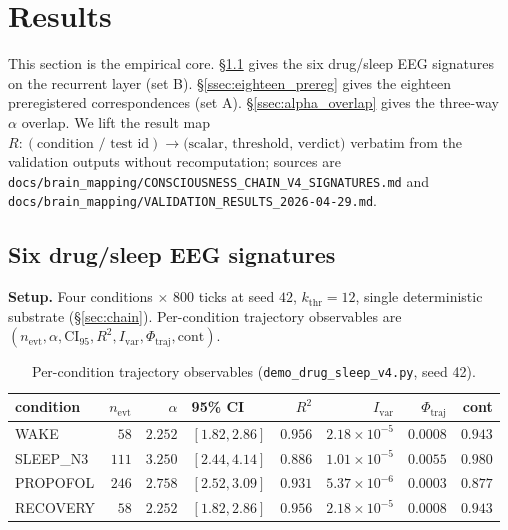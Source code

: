 \section{Results}\label{sec:results}

This section is the empirical core. \S\ref{ssec:six_signatures}
gives the six drug/sleep EEG signatures on the recurrent layer
(set B). \S\ref{ssec:eighteen_prereg} gives the eighteen
preregistered correspondences (set A). \S\ref{ssec:alpha_overlap}
gives the three-way $\alpha$ overlap. We lift the result map
$R\colon (\text{condition / test id}) \to \text{(scalar, threshold,
verdict)}$ verbatim from the validation outputs without
recomputation; sources are
\texttt{docs/brain\_mapping/CONSCIOUSNESS\_CHAIN\_V4\_SIGNATURES.md}
and \texttt{docs/brain\_mapping/VALIDATION\_RESULTS\_2026-04-29.md}.

\subsection{Six drug/sleep EEG signatures}\label{ssec:six_signatures}

\textbf{Setup.} Four conditions $\times$ $800$ ticks at seed $42$,
$k_{\mathrm{thr}}=12$, single deterministic substrate
(\S\ref{sec:chain}). Per-condition trajectory observables are
$(n_{\mathrm{evt}}, \alpha, \mathrm{CI}_{95}, R^{2}, I_{\mathrm{var}},
\Phi_{\mathrm{traj}}, \mathrm{cont})$.

\begin{table}[ht]
\centering
\small
\caption{Per-condition trajectory observables (\texttt{demo\_drug\_sleep\_v4.py},
seed 42).}
\label{tab:per_condition}
\begin{tabular}{l r r l r r r r}
\toprule
condition & $n_{\mathrm{evt}}$ & $\alpha$ & 95\% CI & $R^{2}$ & $I_{\mathrm{var}}$ & $\Phi_{\mathrm{traj}}$ & cont \\
\midrule
WAKE      & $58$  & $2.252$ & $[1.82, 2.86]$ & $0.956$ & $2.18\!\times\!10^{-5}$ & $0.0008$ & $0.943$ \\
SLEEP\_N3 & $111$ & $3.250$ & $[2.44, 4.14]$ & $0.886$ & $1.01\!\times\!10^{-5}$ & $0.0055$ & $0.980$ \\
PROPOFOL  & $246$ & $2.758$ & $[2.52, 3.09]$ & $0.931$ & $5.37\!\times\!10^{-6}$ & $0.0003$ & $0.877$ \\
RECOVERY  & $58$  & $2.252$ & $[1.82, 2.86]$ & $0.956$ & $2.18\!\times\!10^{-5}$ & $0.0008$ & $0.943$ \\
\bottomrule
\end{tabular}
\end{table}

